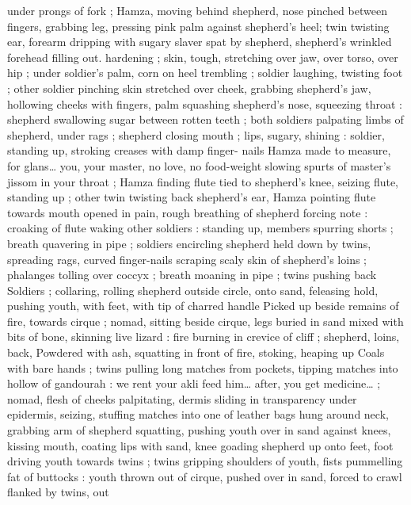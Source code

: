 under prongs of fork{\td} {\gr} ; Hamza, moving behind shepherd, nose 
pinched between fingers, grabbing leg, pressing pink palm against 
shepherd's heel; twin twisting ear, forearm dripping with sugary 
slaver spat by shepherd, shepherd's wrinkled forehead filling out. 
hardening ; skin, tough, stretching over jaw, over torso, over hip ; 
under soldier's palm, corn on heel trembling ; soldier laughing, 
twisting foot ; other soldier pinching skin stretched over cheek, 
grabbing shepherd's jaw, hollowing cheeks with fingers, palm 
squashing shepherd's nose, squeezing throat : shepherd swallowing 
sugar between rotten teeth ; both soldiers palpating limbs of 
shepherd, under rags ; shepherd closing mouth ; lips, sugary, 
shining : soldier, standing up, stroking creases with damp finger- 
nails{\td} {\gl} Hamza{\td} made to measure, for glans{\ldots} you, your master, no 
love, no food-weight slowing spurts of master's jissom in your 
throat{\td} {\gr} ; Hamza finding flute tied to shepherd's knee, seizing flute, 
standing up ; other twin twisting back shepherd's ear, Hamza pointing 
flute towards mouth opened in pain, rough breathing of shepherd 
forcing note : croaking of flute waking other soldiers : standing up, 
members spurring shorts ; breath quavering in pipe ; soldiers 
encircling shepherd held down by twins, spreading rags, curved 
finger-nails scraping scaly skin of shepherd's loins ; phalanges 
tolling over coccyx ; breath moaning in pipe ; twins pushing back 
Soldiers ; collaring, rolling shepherd outside circle, onto sand, 
feleasing hold, pushing youth, with feet, with tip of charred handle 
Picked up beside remains of fire, towards cirque ; nomad, sitting 
beside cirque, legs buried in sand mixed with bits of bone, skinning 
live lizard : fire burning in crevice of cliff ; shepherd, loins, back, 
Powdered with ash, squatting in front of fire, stoking, heaping up 
Coals with bare hands ; twins pulling long matches from pockets, 
tipping matches into hollow of gandourah : {\gl} we rent your akli{\td} feed 
him{\ldots} after, you get medicine{\ldots} {\gr} ; nomad, flesh of cheeks palpitating, 
dermis sliding in transparency under epidermis, seizing, stuffing 
matches into one of leather bags hung around neck, grabbing arm of 
shepherd squatting, pushing youth over in sand against knees, 
kissing mouth, coating lips with sand, knee goading shepherd up 
onto feet, foot driving youth towards twins ; twins gripping shoulders 
of youth, fists pummelling fat of buttocks : youth thrown out of 
cirque, pushed over in sand, forced to crawl flanked by twins, out 
